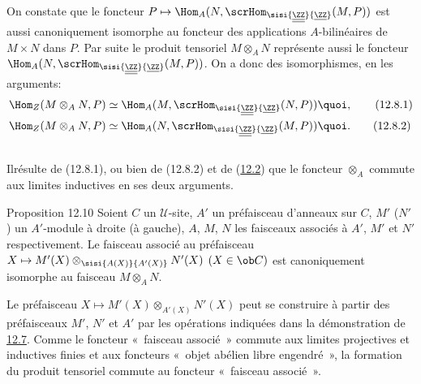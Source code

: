 \documentclass[10pt]{../fichiers-configuration-latex/smfart}
\begin{document}
\setcounter{subsection}{7}





\subsection{}
On constate que le foncteur $P\mapsto \Hom_A(N,\scrHom_{\sisi{\underline{\underline{\ZZ}}}{\underline{\ZZ}}}(M,P))$ est
aussi canoniquement isomorphe au foncteur des applications
$A$-bilinéaires de $M\times N$ dans $P$. Par suite le produit
tensoriel $M\otimes_A N$ représente aussi le foncteur
$\Hom_A(N,\scrHom_{\sisi{\underline{\underline{\ZZ}}}{\underline{\ZZ}}}(M,P))$. On a donc des isomorphismes, 
en  les arguments:
\begin{align*}%
\Hom_Z(M\otimes_A N,P) &\simeq \Hom_A(M,\scrHom_{\sisi{\underline{\underline{\ZZ}}}{\underline{\ZZ}}}(N,P)){\quoi},\tag{12.8.1}\\
\Hom_Z(M\otimes_A N,P) &\simeq \Hom_A (N,\scrHom_{\sisi{\underline{\underline{\ZZ}}}{\underline{\ZZ}}}(M,P)){\quoi}.\tag{12.8.2}
\end{align*}

\subsection{}
Il\pageoriginale résulte de (12.8.1), ou bien de
(12.8.2) et de (\hyperref[IV.subsec12.2]{12.2}) que le foncteur
$\otimes_A$ commute aux limites inductives en ses deux arguments.

\begin{enonce*}{Proposition 12.10}
Soient $C$ un $𝒰$-site, $A'$ un préfaisceau d'anneaux sur
$C$, $M'$ (\resp $N'$) un $A'$-module à droite (\resp à gauche),
$A$, $M$, $N$ les faisceaux associés à $A'$, $M'$ et $N'$
respectivement. Le faisceau associé au préfaisceau $X\mapsto
M'(X)\otimes_{\sisi{A(X)}{A'(X)}}N'(X)$ $(X\in \ob C)$ est canoniquement isomorphe
au faisceau $M\otimes_A N$.
\end{enonce*}

Le préfaisceau $X\mapsto M'(X)\otimes_{A'(X)}N'(X)$ peut se
construire à partir des préfaisceaux $M'$, $N'$ et $A'$ par les
opérations indiquées dans la démonstration de \hyperref[IV.prop12.7]{12.7}.
Comme le foncteur « faisceau associé » commute aux limites
projectives et inductives finies et aux foncteurs « objet abélien
libre engendré », la formation du produit tensoriel commute au
foncteur « faisceau associé ».
\end{document}
